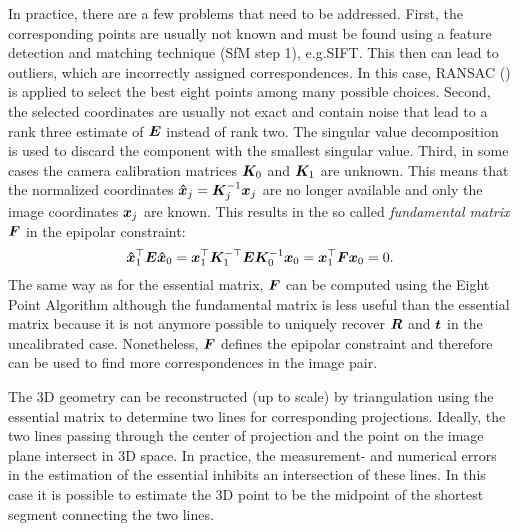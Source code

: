 			In practice, there are a few problems that need to be addressed.
			First, the corresponding points are usually not known and must be found using a feature detection and matching technique (SfM step 1), e.g.\@ SIFT.
			This then can lead to outliers, which are incorrectly assigned correspondences.
			In this case, {RANSAC} (\cite{fischler1981random}) is applied to select the best eight points among many possible choices.
			Second, the selected coordinates are usually not exact and contain noise that lead to a rank three estimate of $\bm{E}$ instead of rank two.
			The singular value decomposition is used to discard the component with the smallest singular value.
			Third, in some cases the camera calibration matrices $\bm{K}_0$ and $\bm{K}_1$ are unknown.
			This means that the normalized coordinates $\bm{\hat{x}}_j = \bm{K}_j^{-1} \bm{x}_j$ are no longer available and only the image coordinates $\bm{x}_j$ are known.
			This results in the so called \emph{fundamental matrix} $\bm{F}$ in the epipolar constraint:
			\begin{equation}\label{eq:fundamental_matrix_epipolar_constraint}
				\bm{\hat{x}}_1^\top \bm{E} \bm{\hat{x}}_0 = 
				\bm{x}_1^\top \bm{K}_1^{-\top} \bm{E} \bm{K}_0^{-1} \bm{x}_0 = 
				\bm{x}_1^\top \bm{F} \bm{x}_0 = 0.
			\end{equation}
			The same way as for the essential matrix, $\bm{F}$ can be computed using the Eight Point Algorithm although the fundamental matrix is less useful than the essential matrix because it is not anymore possible to uniquely recover $\bm{R}$ and $\bm{t}$ in the uncalibrated case.
			Nonetheless, $\bm{F}$ defines the epipolar constraint and therefore can be used to find more correspondences in the image pair.
			
			The 3D geometry can be reconstructed (up to scale) by triangulation using the essential matrix to determine two lines for corresponding projections.
			Ideally, the two lines passing through the center of projection and the point on the image plane intersect in 3D space.
			In practice, the measurement- and numerical errors in the estimation of the essential inhibits an intersection of these lines.
			In this case it is possible to estimate the 3D point to be the midpoint of the shortest segment connecting the two lines.
			
